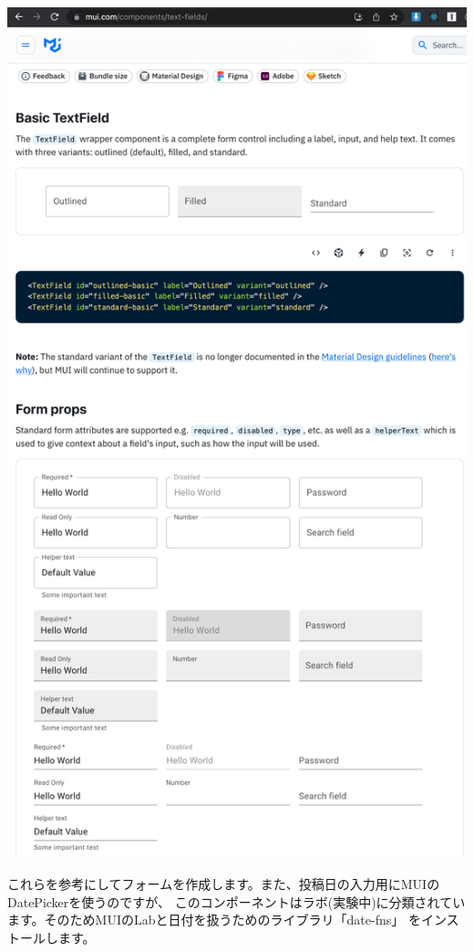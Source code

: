 \begin{reviewimage}%
\includegraphics[width=0.6\maxwidth]{./images/03-todo-with-react/mui016-muisite-textField.png}%
\label{image:03-todo-with-react:mui016-muisite-textField}
\end{reviewimage}

これらを参考にしてフォームを作成します。また、投稿日の入力用にMUIのDatePickerを使うのですが、
このコンポーネントはラボ(実験中)に分類されています。そのためMUIのLabと日付を扱うためのライブラリ「date{-}fns」
をインストールします。


